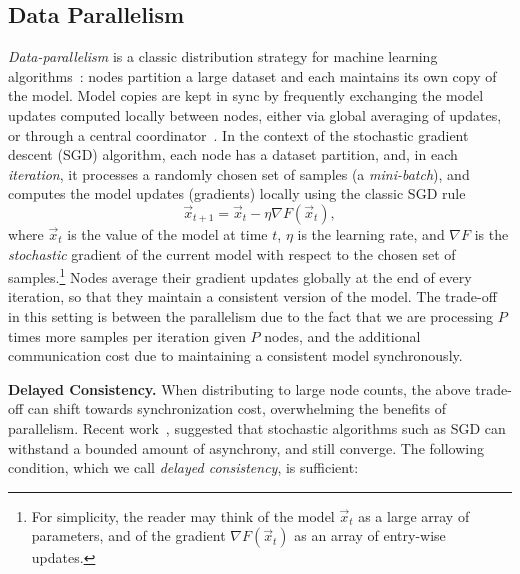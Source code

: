 \documentclass[11pt]{article}
\renewcommand{\paragraph}[1]{\vspace{0.1em} \noindent \textbf{#1}}
\begin{document}
\subsection{Data Parallelism}

\emph{Data-parallelism} is a classic distribution strategy for machine
learning algorithms~\cite{TF,
	CNTK}: nodes partition a large dataset and each maintains
its own copy of the model. Model copies are kept in sync by frequently
exchanging the model updates computed locally between nodes, either via global
averaging of updates, or through a central coordinator~\cite{PS}.  In the context of the
stochastic gradient descent (SGD) algorithm, each node has a dataset partition, and, in each \emph{iteration}, it processes a randomly chosen set of samples (a \emph{mini-batch}), and computes
the model updates (gradients) locally using the classic SGD rule 
$$
\vec{x}_{t+1} = \vec{x}_t - \eta \nabla F(\vec{x}_t),
$$
\noindent where $\vec{x}_t$ is the value of the model at time $t$,
$\eta$ is the learning rate, and $\nabla F$ is the \emph{stochastic}
gradient of the current model with respect to the chosen set of samples.\footnote{For simplicity, the reader may think of the model $\vec{x}_t$ as a large array of parameters, and of the gradient $\nabla F(\vec{x}_t)$ as an array of entry-wise updates.}
%
Nodes average their gradient updates globally at the end of every
iteration, so that they maintain a consistent version of the model.  The
trade-off in this setting is between the parallelism due to the fact
that we are processing $P$ times more samples per iteration given $P$
nodes, and the additional communication cost due to maintaining a consistent model synchronously.  


\paragraph{Delayed Consistency.} When distributing to large node counts, the above trade-off can shift towards synchronization cost, overwhelming the benefits of parallelism. 
Recent work~\cite{recht2011hogwild, liu2015asynchronous}, suggested that stochastic algorithms such as SGD can withstand a bounded amount of asynchrony, and still converge. 
The following condition, which we call \emph{delayed consistency}, is sufficient: 
\end{document}
